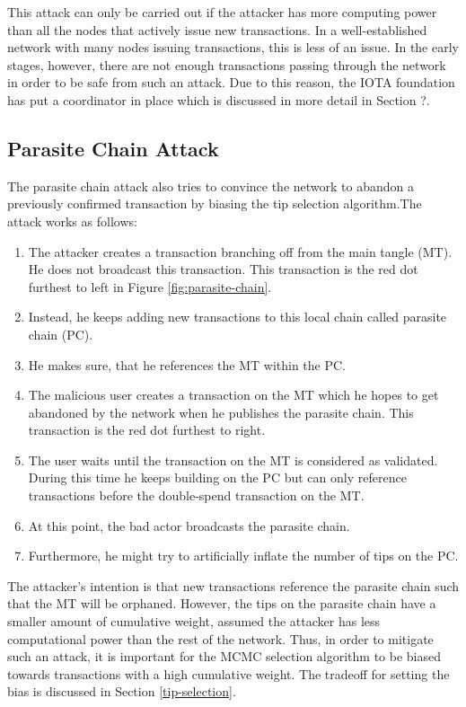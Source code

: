 This attack can only be carried out if the attacker has more computing power than all the nodes that actively issue new transactions. In a well-established network with many nodes issuing transactions, this is less of an issue. In the early stages, however, there are not enough transactions passing through the network in order to be safe from such an attack. Due to this reason, the IOTA foundation has put a coordinator in place which is discussed in more detail in Section ?.

\subsection{Parasite Chain Attack}
The parasite chain attack also tries to convince the network to abandon a previously confirmed transaction by biasing the tip selection algorithm.The attack works as follows:
\begin{enumerate}
    \item The attacker creates a transaction branching off from the main tangle (MT). He does not broadcast this transaction. This transaction is the red dot furthest to left in Figure \ref{fig:parasite-chain}.
    \item Instead, he keeps adding new transactions to this local chain called parasite chain (PC).
    \item He makes sure, that he references the MT within the PC.
    \item The malicious user creates a transaction on the MT which he hopes to get abandoned by the network when he publishes the parasite chain. This transaction is the red dot furthest to right.
    \item The user waits until the transaction on the MT is considered as validated. During this time he keeps building on the PC but can only reference transactions before the double-spend transaction on the MT.
    \item At this point, the bad actor broadcasts the parasite chain.
    \item Furthermore, he might try to artificially inflate the number of tips on the PC.
\end{enumerate}

The attacker's intention is that new transactions reference the parasite chain such that the MT will be orphaned. 
However, the tips on the parasite chain have a smaller amount of cumulative weight, assumed the attacker has less computational power than the rest of the network. 
Thus, in order to mitigate such an attack, it is important for the MCMC selection algorithm to be biased towards transactions with a high cumulative weight. The tradeoff for setting the bias is discussed in Section \ref{tip-selection}.

